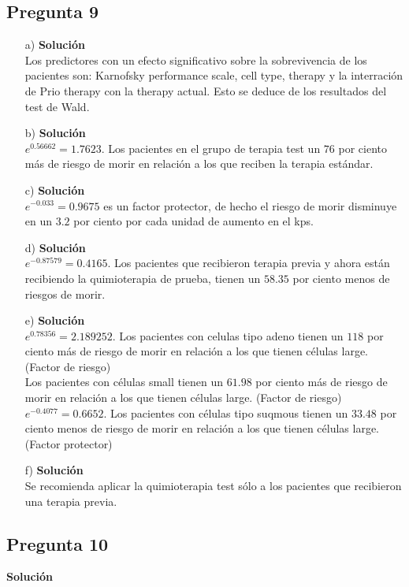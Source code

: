 \documentclass[10pt]{article}\usepackage[]{graphicx}\usepackage[]{color}
\begin{document}
{\subsection*{Pregunta 9}
\begin{itemize}
\item[a)] \textbf{Solución}\\ 
Los predictores con un efecto significativo sobre la sobrevivencia de los pacientes son: Karnofsky performance scale, cell type, therapy y la interración de Prio therapy con la therapy actual. Esto se deduce de los resultados del test de Wald.
\item[b)] \textbf{Solución}\\ 
$e^{0.56662}=1.7623$. Los pacientes en el grupo de terapia test un $76$ por ciento más de riesgo de morir en relación a los que reciben la terapia estándar.
\item[c)] \textbf{Solución}\\ 
$e^{-0.033}=0.9675$ es un factor protector, de hecho el riesgo de morir disminuye en un $3.2$ por ciento por cada unidad de aumento en el kps.
\item[d)] \textbf{Solución}\\ 
$e^{-0.87579}=0.4165$. Los pacientes que recibieron terapia previa y ahora están recibiendo la quimioterapia de prueba, tienen un $58.35$ por ciento menos de riesgos de morir.
\item[e)] \textbf{Solución}\\ 
$e^{0.78356}=2.189252$. Los pacientes con celulas tipo adeno tienen un $118$ por ciento más de riesgo de morir en relación a los que tienen células large. (Factor de riesgo) \\
Los pacientes con células small tienen un $61.98$ por ciento más de riesgo de morir en relación a los que tienen células large. (Factor de riesgo)\\
$e^{-0.4077}=0.6652$. Los pacientes con células tipo suqmous tienen un $33.48$ por ciento menos de riesgo de morir en relación a los que tienen células large. (Factor protector)
\item[f)] \textbf{Solución}\\ 
Se recomienda aplicar la quimioterapia test sólo a los pacientes que recibieron una terapia previa.

\end{itemize}


\subsection*{Pregunta 10}
\textbf{Solución}\\

}
\end{document}
